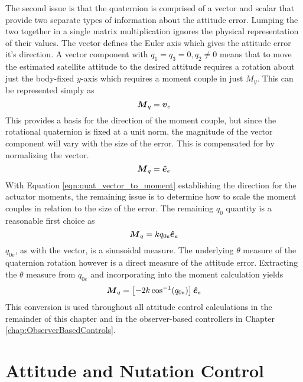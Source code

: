 The second issue is that the quaternion is comprised of a vector and scalar that provide two separate types of information about the attitude error.  Lumping the two together in a single matrix multiplication ignores the physical representation of their values.  The vector defines the Euler axis which gives the attitude error it's direction.  A vector component with $q_1 = q_3 = 0, q_2 \ne 0$ means that to move the estimated satellite attitude to the desired attitude requires a rotation about just the body-fixed $y$-axis which requires a moment couple in just $M_y$.  This can be represented simply as
\begin{equation}
  \boldsymbol{M}_{q} = \boldsymbol{v}_e
\end{equation}
This provides a basis for the direction of the moment couple, but since the rotational quaternion is fixed at a unit norm, the magnitude of the vector component will vary with the size of the error.  This is compensated for by normalizing the vector.
\begin{equation}
  \boldsymbol{M}_{q} = \boldsymbol{\hat{e}}_e
  \label{eqn:quat_vector_to_moment}
\end{equation}
With Equation \ref{eqn:quat_vector_to_moment} establishing the direction for the actuator moments, the remaining issue is to determine how to scale the moment couples in relation to the size of the error.  The remaining $q_0$ quantity is a reasonable first choice as
\begin{equation}
  \boldsymbol{M}_{q} = kq_{0e} \boldsymbol{\hat{e}}_e
\end{equation}
$q_{0e}$, as with the vector, is a sinusoidal measure.  The underlying $\theta$ measure of the quaternion rotation however is a direct measure of the attitude error.  Extracting the $\theta$ measure from $q_{0e}$ and incorporating into the moment calculation yields
\begin{equation}
  \boldsymbol{M}_{q} = \left[-2 k \cos^{-1} (q_{0e}) \right] \boldsymbol{\hat{e}}_e
  \label{eqn:QuaternionToMomentConversion}
\end{equation}
This conversion is used throughout all attitude control calculations in the remainder of this chapter and in the observer-based controllers in Chapter \ref{chap:ObserverBasedControls}.










\section{Attitude and Nutation Control}
\label{sec:AttitudeAndNutationControl}

